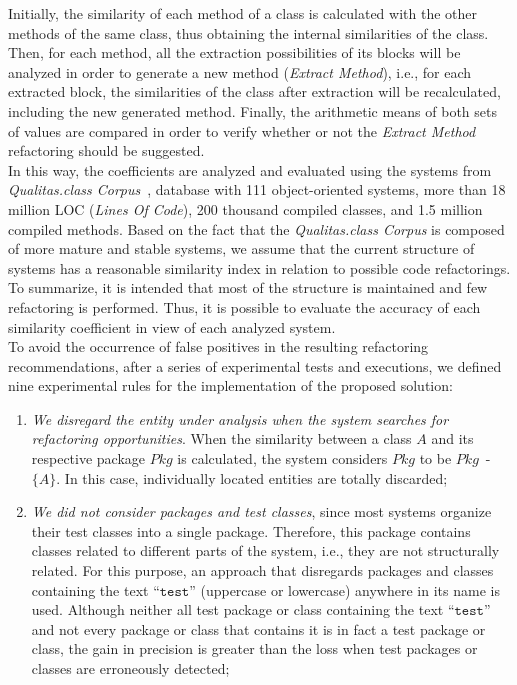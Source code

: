 \documentclass[smallextended,natbib]{svjour3}
\newcommand{\aspas}[1]{{``#1''}}
\newcommand{\mcode}[1]{{$\mathtt{#1}$}}
\begin{document}
{ Initially, the similarity of each method of a class is calculated with the other methods of the same class, thus obtaining the internal similarities of the class. Then, for each method, all the extraction possibilities of its blocks will be analyzed in order to generate a new method (\textit{Extract Method}), i.e., for each extracted block, the similarities of the class after extraction will be recalculated, including the new generated method. Finally, the arithmetic means of both sets of values are compared in order to verify whether or not the \textit{Extract Method} refactoring should be suggested.\\[-0.2cm]

In this way, the coefficients are analyzed and evaluated using the systems from \textit{Qualitas.class Corpus}~\citep{qc}, database with 111 object-oriented systems, more than 18 million LOC (\textit{Lines Of Code}), 200 thousand compiled classes, and 1.5 million compiled methods. Based on the fact that the \textit{Qualitas.class Corpus} is composed of more mature and stable systems, we assume that the current structure of systems has a reasonable similarity index in relation to possible code refactorings. To summarize, it is intended that most of the structure is maintained and few refactoring is performed. Thus, it is possible to evaluate the accuracy of each similarity coefficient in view of each analyzed system. \\[-0.3cm]

 To avoid the occurrence of false positives in the resulting refactoring recommendations, after a series of experimental tests and executions, we defined nine experimental rules for the implementation of the proposed solution:

\begin{enumerate}
    \item \textit{We disregard the entity under analysis when the system searches for refactoring opportunities}. When the similarity between a class $A$ and its respective package $Pkg$ is calculated, the system considers $Pkg$ to be \mbox{$Pkg$ - $\{A\}$}. In this case, individually located entities are totally discarded; \\[-0.2cm]
    
    \item \textit{We did not consider packages and test classes}, since most systems organize their test classes into a single package. Therefore, this package contains classes related to different parts of the system, i.e., they are not structurally related. For this purpose, an approach that disregards packages and classes containing the text \aspas{\mcode{test}} (uppercase or lowercase) anywhere in its name is used. Although neither all test package or class containing the text \aspas{\mcode{test}} and not every package or class that contains it is in fact a test package or class, the gain in precision is greater than the loss when test packages or classes are erroneously detected;\\[-0.2cm]
    

\end{enumerate}}
\end{document}
